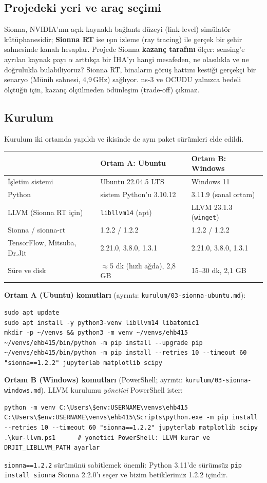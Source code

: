 
\subsection*{Projedeki yeri ve araç seçimi}
Sionna, NVIDIA'nın açık kaynaklı bağlantı düzeyi (link-level) simülatör kütüphanesidir; \textbf{Sionna RT} ise ışın izleme (ray tracing) ile gerçek bir şehir sahnesinde kanalı hesaplar. Projede Sionna \textbf{kazanç tarafını} ölçer: sensing'e ayrılan kaynak payı $\alpha$ arttıkça bir İHA'yı hangi mesafeden, ne olasılıkla ve ne doğrulukla bulabiliyoruz? Sionna RT, binaların görüş hattını kestiği gerçekçi bir senaryo (Münih sahnesi, 4,9\,GHz) sağlıyor. ns-3 ve OCUDU yalnızca bedeli ölçtüğü için, kazanç ölçülmeden ödünleşim (trade-off) çıkmaz.

\subsection*{Kurulum}
Kurulum iki ortamda yapıldı ve ikisinde de aynı paket sürümleri elde edildi.
\begin{center}\sffamily\small
\begin{tabular}{@{}lll@{}}
\toprule
 & \textbf{Ortam A: Ubuntu} & \textbf{Ortam B: Windows} \\
\midrule
İşletim sistemi & Ubuntu 22.04.5 LTS & Windows 11 \\
Python & sistem Python'u 3.10.12 & 3.11.9 (sanal ortam) \\
LLVM (Sionna RT için) & \texttt{libllvm14} (apt) & LLVM 23.1.3 (\texttt{winget}) \\
Sionna / sionna-rt & 1.2.2 / 1.2.2 & 1.2.2 / 1.2.2 \\
TensorFlow, Mitsuba, Dr.Jit & 2.21.0, 3.8.0, 1.3.1 & 2.21.0, 3.8.0, 1.3.1 \\
Süre ve disk & $\approx$5 dk (hızlı ağda), 2,8 GB & 15--30 dk, 2,1 GB \\
\bottomrule
\end{tabular}
\end{center}
\textbf{Ortam A (Ubuntu) komutları} (ayrıntı: \texttt{kurulum/03-sionna-ubuntu.md}):
\begin{lstlisting}
sudo apt update
sudo apt install -y python3-venv libllvm14 libatomic1
mkdir -p ~/venvs && python3 -m venv ~/venvs/ehb415
~/venvs/ehb415/bin/python -m pip install --upgrade pip
~/venvs/ehb415/bin/python -m pip install --retries 10 --timeout 60 "sionna==1.2.2" jupyterlab matplotlib scipy
\end{lstlisting}
\textbf{Ortam B (Windows) komutları} (PowerShell; ayrıntı: \texttt{kurulum/03-sionna-windows.md}). LLVM kurulumu \emph{yönetici} PowerShell ister:
\begin{lstlisting}
python -m venv C:\Users\$env:USERNAME\venvs\ehb415
C:\Users\$env:USERNAME\venvs\ehb415\Scripts\python.exe -m pip install --retries 10 --timeout 60 "sionna==1.2.2" jupyterlab matplotlib scipy
.\kur-llvm.ps1      # yonetici PowerShell: LLVM kurar ve DRJIT_LIBLLVM_PATH ayarlar
\end{lstlisting}
\texttt{sionna==1.2.2} sürümünü sabitlemek önemli: Python 3.11'de sürümsüz \texttt{pip install sionna} Sionna 2.2.0'ı seçer ve bizim betiklerimiz 1.2.2 içindir.

